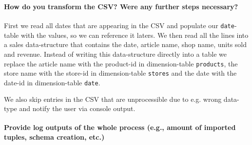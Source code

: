 \documentclass[a4paper,english,abstract=on]{scrartcl}
\begin{document}
\textbf{How do you transform the CSV? Were any further steps necessary?}
~\\~\\
First we read all dates that are appearing in the CSV and populate our \texttt{date}-table with the values, so we can reference it laters. We then read all the lines into a sales data-structure that contains the date, article name, shop name, units sold and revenue. Instead of writing this data-structure directly into a table we replace the article name with the product-id in dimension-table \texttt{products}, the store name with the store-id in dimension-table \texttt{stores} and the date with the date-id in dimension-table \texttt{date}.

We also skip entries in the CSV that are unprocessible due to e.g. wrong data-type and notify the user via console output.
~\\~\\
\textbf{Provide log outputs of the whole process (e.g., amount of imported tuples, schema creation, etc.)}
\end{document}
